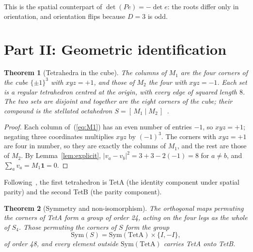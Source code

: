 \documentclass[twocolumn]{iopjournal}
\newtheorem{theorem}{Theorem}
\theoremstyle{definition}
\theoremstyle{remark}
\begin{document}
\noindent
This is the spatial counterpart of $\det(Pe) = -\det e$: the roots
differ only in orientation, and orientation flips because $D = 3$ is
odd.


\section*{Part II: Geometric identification}

\begin{theorem}[Tetrahedra in the cube]
\label{thm:cube}
The columns of $M_1$ are the four corners of the cube $\{\pm1\}^3$
with $xyz = +1$, and those of $M_2$ the four with $xyz = -1$. Each
set is a regular tetrahedron centred at the origin, with every edge
of squared length $8$. The two sets are disjoint and together are the
eight corners of the cube; their compound is the stellated
octahedron $S = [\,M_1 \mid M_2\,]$~\cite{Kepler1619,Coxeter1973}.
\end{theorem}

\begin{proof}
Each column of~(\ref{eq:M1}) has an even number of entries $-1$, so
$xyz = +1$; negating three coordinates multiplies $xyz$ by
$(-1)^3$. The corners with $xyz = +1$ are four in number, so they are
exactly the columns of $M_1$, and the rest are those of $M_2$. By
Lemma~\ref{lem:explicit},
$|v_a - v_b|^2 = 3 + 3 - 2(-1) = 8$ for $a \neq b$, and
$\sum_a v_a = M_1\mathbf{1} = 0$.
\end{proof}

\noindent
Following~\cite{NelsonLetter1,NelsonScheme}, the first tetrahedron is
TetA (the identity component under spatial parity) and the second
TetB (the parity component).

\begin{theorem}[Symmetry and non-isomorphism]
\label{thm:sym}
The orthogonal maps permuting the corners of TetA form a group of
order 24, acting on the four legs as the whole of $S_4$. Those
permuting the corners of $S$ form the group
\begin{equation}
  \mathrm{Sym}(S) = \mathrm{Sym}(\mathrm{TetA}) \times \{I, -I\},
  \label{eq:sym}
\end{equation}
of order 48, and every element outside $\mathrm{Sym}(\mathrm{TetA})$
carries TetA onto TetB.
\end{theorem}
\end{document}
